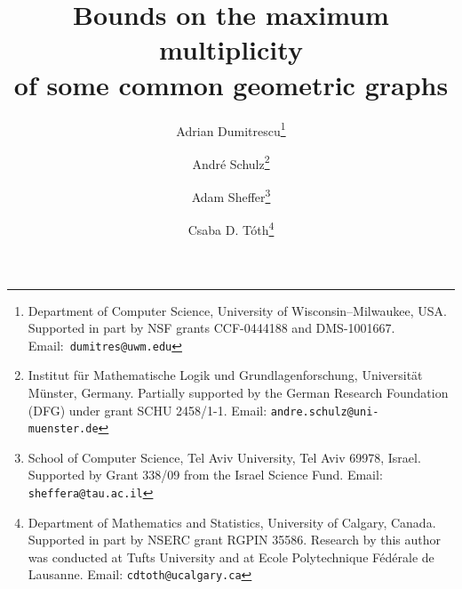 \documentclass[11pt]{article}
\begin{document}
\title{Bounds on the maximum multiplicity\\
 of some common geometric graphs}

\author{
Adrian Dumitrescu\thanks{Department of Computer Science,
University of Wisconsin--Milwaukee, USA\@.
Supported in part by NSF grants CCF-0444188 and DMS-1001667.
Email:~\texttt{dumitres@uwm.edu}}
\and
Andr\'e Schulz\thanks{Institut f\"ur Mathematische Logik und Grundlagenforschung, Universit\"at M\"unster,
Germany\@. Partially supported by the German Research Foundation (DFG)
under grant SCHU 2458/1-1.
Email: \texttt{andre.schulz@uni-muenster.de} }
\and
Adam Sheffer\thanks{School of Computer Science, Tel Aviv University, Tel Aviv 69978, Israel\@.
Supported by Grant 338/09 from
the Israel Science Fund.
Email: \texttt{sheffera@tau.ac.il} }
\and
Csaba D. T\'oth\thanks{Department of Mathematics and Statistics,
University of Calgary, Canada\@. Supported in part by NSERC grant
RGPIN 35586.
Research by this author was conducted at Tufts University and at
Ecole Polytechnique F\'ed\'erale de Lausanne.
Email: \texttt{cdtoth@ucalgary.ca} }
}

\maketitle
\end{document}
